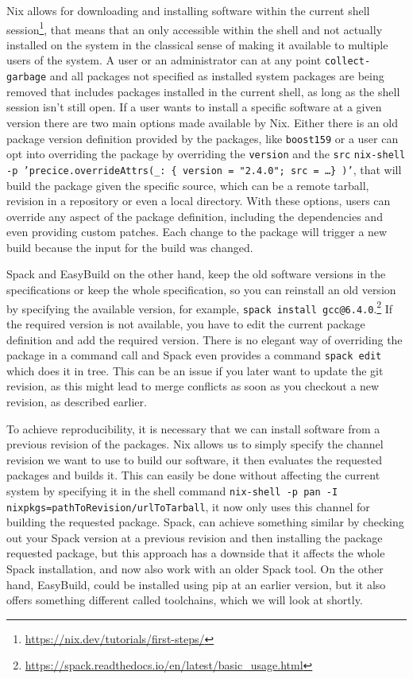 \documentclass[conference,final,a4paper]{IEEEtran}
\begin{document}
Nix allows for downloading and installing software within the current shell session\footnote{\url{https://nix.dev/tutorials/first-steps/}}, that means that an only accessible within the shell and not actually installed on the system in the classical sense of making it available to multiple users of the system.
A user or an administrator can at any point \texttt{collect-garbage} and all packages not specified as installed system packages are being removed that includes packages installed in the current shell, as long as the shell session isn't still open.
If a user wants to install a specific software at a given version there are two main options made available by Nix.
Either there is an old package version definition provided by the packages, like \texttt{boost159} or a user can opt into overriding the package by overriding the \texttt{version} and the \texttt{src} \texttt{nix-shell -p 'precice.overrideAttrs(\_: \{ version = "2.4.0"; src = \ldots \} )'}, that will build the package given the specific source, which can be a remote tarball, revision in a repository or even a local directory.
With these options, users can override any aspect of the package definition, including the dependencies and even providing custom patches.
Each change to the package will trigger a new build because the input for the build was changed.

Spack and EasyBuild on the other hand, keep the old software versions in the specifications or keep the whole specification, so you can reinstall an old version by specifying the available version, for example, \texttt{spack install gcc@6.4.0}.\footnote{\url{https://spack.readthedocs.io/en/latest/basic_usage.html}}
If the required version is not available, you have to edit the current package definition and add the required version.
There is no elegant way of overriding the package in a command call and Spack even provides a command \texttt{spack edit} which does it in tree.
This can be an issue if you later want to update the git revision, as this might lead to merge conflicts as soon as you checkout a new revision, as described earlier.

To achieve reproducibility, it is necessary that we can install software from a previous revision of the packages.
Nix allows us to simply specify the channel revision we want to use to build our software, it then evaluates the requested packages and builds it.
This can easily be done without affecting the current system by specifying it in the shell command \texttt{nix-shell -p pan -I nixpkgs=pathToRevision/urlToTarball}, it now only uses this channel for building the requested package.
Spack, can achieve something similar by checking out your Spack version at a previous revision and then installing the package requested package, but this approach has a downside that it affects the whole Spack installation, and now also work with an older Spack tool.
On the other hand, EasyBuild, could be installed using pip at an earlier version, but it also offers something different called toolchains, which we will look at shortly.
\end{document}
